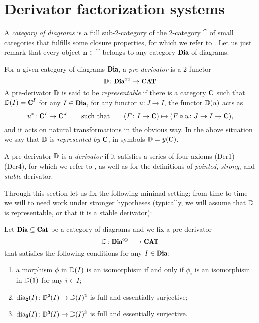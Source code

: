 \section{Derivator factorization systems}\label{sec:squaring}

A {\em category of diagrams} is a full sub-2-category of the 2-category $\cat$ of small categories  that fulfills some closure properties, for which we refer to \cite[\adef\textbf{4.21}]{Moritz}. Let us just remark that every object $\mathbf{n}\in\cat$ belongs to any category $\Dia$ of diagrams.

For a given category of diagrams $\Dia$, a {\em pre-derivator} is  a 2-functor
\[
\D\colon \Dia^\opp\to \Cat
\]
A pre-derivator $\mathbb{D}$ is said to be {\em representable} if there is a category $\C$ such that $\D(I)=\C^{I}$ for any $I\in \Dia$, for any functor $u\colon J\to I$, the functor $\mathbb{D}(u)$ acts as 
\[
u^*\colon \C^I\to \C^J\qquad\text{such that}\qquad ( F\colon I\to \C)\mapsto (F\circ u\colon J\to I\to \C),
\]
and it acts on natural transformations in the obvious way. In the above situation we say that $\mathbb{D}$ is {\em represented by} $\C$, in symbols $\D=y(\C)$.

A pre-derivator $\mathbb{D}$ is a {\em derivator} if it satisfies a series of four axioms (Der1)--(Der4), for which we refer to \cite{Moritz}, as well as for the definitions of {\em pointed}, {\em strong}, and {\em stable} derivator. 

\medskip
Through this section let us fix the following minimal setting; from time to time we will to need work under stronger hypotheses (typically, we will assume that $\mathbb{D}$ is representable, or that it is a stable derivator):

\begin{setting}\label{setting_sec_3} 
Let $\Dia\subseteq \cat$ be a category of diagrams and we fix a pre-derivator
\[
\D\colon \Dia^\opp\longrightarrow \Cat
\]
that satisfies the following conditions for any $I\in \Dia$:
\begin{enumerate}
\item a morphism $\phi$ in $\mathbb{D}(I)$ is an isomorphism if and only if $\phi_i$ is an isomorphism in $\D(\uno)$ for any $i\in I$;
\item $\dia_\due(I)\colon \D^\due(I)\to \D(I)^\due$ is full and essentially surjective;
\item $\dia_\tre(I)\colon \D^\tre(I)\to \D(I)^\tre$ is full and essentially surjective.
\end{enumerate}
\end{setting}


